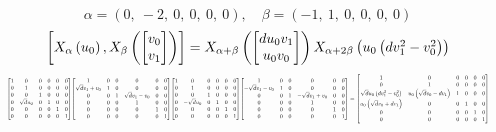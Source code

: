 \documentclass[11pt]{article}
\theoremstyle{definition}
\begin{document}
\[
\alpha = \left( 0, \  -2, \  0, \  0, \  0, \  0\right), \quad \beta = \left( -1, \  1, \  0, \  0, \  0, \  0\right)
\]
\[
\scaletoalign{\textwidth}{\left[ X_{\alpha}\left(u_{0}\right), X_{\beta}\left(\left[\begin{matrix}v_{0}\\v_{1}\end{matrix}\right]\right) \right] = X_{\alpha + \beta}\left(\left[\begin{matrix}d u_{0} v_{1}\\u_{0} v_{0}\end{matrix}\right]\right) X_{\alpha + 2\beta}\left(u_{0} \left(d v_{1}^{2} - v_{0}^{2}\right)\right)}
\]
\[
\scaletoalign{\textwidth}{{\left[\begin{matrix}1 & 0 & 0 & 0 & 0 & 0\\0 & 1 & 0 & 0 & 0 & 0\\0 & 0 & 1 & 0 & 0 & 0\\0 & \sqrt{d} u_{0} & 0 & 1 & 0 & 0\\0 & 0 & 0 & 0 & 1 & 0\\0 & 0 & 0 & 0 & 0 & 1\end{matrix}\right]} {\left[\begin{matrix}1 & 0 & 0 & 0 & 0 & 0\\\sqrt{d} v_{1} + v_{0} & 1 & 0 & 0 & 0 & 0\\0 & 0 & 1 & \sqrt{d} v_{1} - v_{0} & 0 & 0\\0 & 0 & 0 & 1 & 0 & 0\\0 & 0 & 0 & 0 & 1 & 0\\0 & 0 & 0 & 0 & 0 & 1\end{matrix}\right]} {\left[\begin{matrix}1 & 0 & 0 & 0 & 0 & 0\\0 & 1 & 0 & 0 & 0 & 0\\0 & 0 & 1 & 0 & 0 & 0\\0 & - \sqrt{d} u_{0} & 0 & 1 & 0 & 0\\0 & 0 & 0 & 0 & 1 & 0\\0 & 0 & 0 & 0 & 0 & 1\end{matrix}\right]} {\left[\begin{matrix}1 & 0 & 0 & 0 & 0 & 0\\- \sqrt{d} v_{1} - v_{0} & 1 & 0 & 0 & 0 & 0\\0 & 0 & 1 & - \sqrt{d} v_{1} + v_{0} & 0 & 0\\0 & 0 & 0 & 1 & 0 & 0\\0 & 0 & 0 & 0 & 1 & 0\\0 & 0 & 0 & 0 & 0 & 1\end{matrix}\right]} = {\left[\begin{matrix}1 & 0 & 0 & 0 & 0 & 0\\0 & 1 & 0 & 0 & 0 & 0\\\sqrt{d} u_{0} \left(d v_{1}^{2} - v_{0}^{2}\right) & u_{0} \left(\sqrt{d} v_{0} - d v_{1}\right) & 1 & 0 & 0 & 0\\u_{0} \left(\sqrt{d} v_{0} + d v_{1}\right) & 0 & 0 & 1 & 0 & 0\\0 & 0 & 0 & 0 & 1 & 0\\0 & 0 & 0 & 0 & 0 & 1\end{matrix}\right]}}
\]
\end{document}
